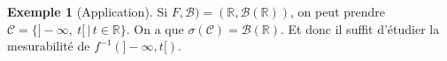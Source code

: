 \documentclass{article}
\theoremstyle{definition}
\theoremstyle{definition}
\theoremstyle{definition}
\theoremstyle{definition}
\newtheorem{example}{Exemple}
\theoremstyle{plain}
\theoremstyle{definition}
\begin{document}
\begin{example}[Application]
	Si $F, \mathscr{B}) = (\mathbb{R}, \mathscr{B}(\mathbb{R}))$, on peut prendre $\mathscr{C} = \{ ]-\infty,\   t[ \, | \, t \in \mathbb{R} \}$. On a que
				$\sigma(\mathscr{C}) = \mathscr{B}(\mathbb{R})$. Et donc il suffit d'étudier la mesurabilité de $f^{-1}(]-\infty, t[)$.
\end{example}
\end{document}

